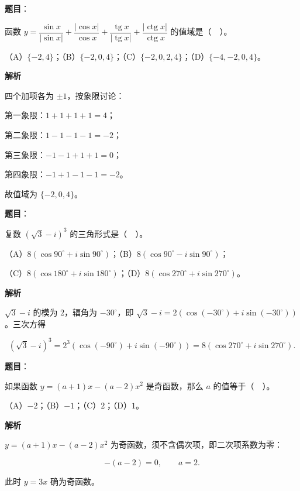 \begin{answer}

\textbf{题目}：

函数 $y=\dfrac{\sin x}{|\sin x|}+\dfrac{|\cos x|}{\cos x}+\dfrac{\operatorname{tg}x}{|\operatorname{tg}x|}+\dfrac{|\operatorname{ctg}x|}{\operatorname{ctg}x}$ 的值域是（　）。

（A）$\{-2,4\}$；（B）$\{-2,0,4\}$；（C）$\{-2,0,2,4\}$；（D）$\{-4,-2,0,4\}$。

\textbf{解析}

四个加项各为 $\pm1$，按象限讨论：

第一象限：$1+1+1+1=4$；

第二象限：$1-1-1-1=-2$；

第三象限：$-1-1+1+1=0$；

第四象限：$-1+1-1-1=-2$。

故值域为 $\{-2,0,4\}$。


\end{answer}
\begin{answer}

\textbf{题目}：

复数 $(\sqrt3-i)^3$ 的三角形式是（　）。

（A）$8(\cos 90^\circ+i\sin 90^\circ)$；（B）$8(\cos 90^\circ-i\sin 90^\circ)$；

（C）$8(\cos 180^\circ+i\sin 180^\circ)$；（D）$8(\cos 270^\circ+i\sin 270^\circ)$。

\textbf{解析}

$\sqrt3-i$ 的模为 $2$，辐角为 $-30^\circ$，即 $\sqrt3-i=2(\cos(-30^\circ)+i\sin(-30^\circ))$。三次方得

\nopagebreak[4]
\[
(\sqrt3-i)^3=2^3\left(\cos(-90^\circ)+i\sin(-90^\circ)\right)
=8(\cos 270^\circ+i\sin 270^\circ).
\]


\end{answer}
\begin{answer}

\textbf{题目}：

如果函数 $y=(a+1)x-(a-2)x^2$ 是奇函数，那么 $a$ 的值等于（　）。

（A）$-2$；（B）$-1$；（C）$2$；（D）$1$。

\textbf{解析}

$y=(a+1)x-(a-2)x^2$ 为奇函数，须不含偶次项，即二次项系数为零：

\nopagebreak[4]
\[
-(a-2)=0,\qquad a=2.
\]

此时 $y=3x$ 确为奇函数。


\end{answer}
